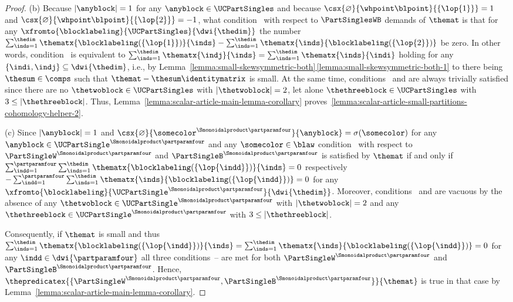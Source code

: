 \documentclass[pdftex]{sigma}
\numberwithin{equation}{section}
\begin{document}
{\begin{proof}
    (b)
 Because $|\anyblock|=1$ for any $\anyblock\in\UCPartSingles$ and because $\csx{\varnothing}{\whpoint\blpoint}{\{\lop{1}\}}=1$ and $\csx{\varnothing}{\whpoint\blpoint}{\{\lop{2}\}}=-1$,  what con\-di\-tion~\conditionone{} with respect to $\PartSinglesWB$ demands of $\themat$ is that for any $\xfromto{\blocklabeling}{\UCPartSingles}{\dwi{\thedim}}$ the number $\sum_{\inds=1}^\thedim\thematx{\blocklabeling(\{\lop{1}\})}{\inds}-\sum_{\inds=1}^\thedim\thematx{\inds}{\blocklabeling(\{\lop{2}\})}$ be zero. In other words, condition~\conditionone{} is equivalent to $\sum_{\inds=1}^\thedim\thematx{\indj}{\inds}=\sum_{\inds=1}^\thedim\thematx{\inds}{\indi}$ holding for any $\{\indi,\indj\}\subseteq \dwi{\thedim}$, i.e., by Lem\-ma~\hyperref[lemma:small-skewsymmetric-both-1]{\ref*{lemma:small-skewsymmetric-both}\,\ref*{lemma:small-skewsymmetric-both-1}} to there being $\thesum\in\comps$ such that $\themat-\thesum\identitymatrix$ is small.
    At the same time, con\-di\-tions~\conditiontwo{} and \conditionthree{} are always trivially satisfied since there are no $\thetwoblock\in \UCPartSingles$ with $|\thetwoblock|=2$, let alone $\thethreeblock\in\UCPartSingles$ with $3\leq|\thethreeblock|$. Thus,  Lem\-ma~\ref{lemma:scalar-article-main-lemma-corollary} proves~\ref{lemma:scalar-article-small-partitions-cohomology-helper-2}.

  (c)
 Since $|\anyblock|=1$ and $\csx{\varnothing}{\somecolor^{\Smonoidalproduct\partparamfour}}{\anyblock}=\sigma(\somecolor)$ for any $\anyblock\in \UCPartSingle^{\Smonoidalproduct\partparamfour}$ and any $\somecolor\in\blaw$ con\-di\-tion~\conditionone{}  with respect to $\PartSingleW^{\Smonoidalproduct\partparamfour}$ and $\PartSingleB^{\Smonoidalproduct\partparamfour}$ is satisfied by $\themat$ if and only if $\sum_{\indd=1}^\partparamfour\sum_{\inds=1}^\thedim \thematx{\blocklabeling(\{\lop{\indd}\})}{\inds}=0$ respectively $-\sum_{\indd=1}^\partparamfour\sum_{\inds=1}^\thedim \thematx{\inds}{\blocklabeling(\{\lop{\indd}\})}=0$
for any $\xfromto{\blocklabeling}{\UCPartSingle^{\Smonoidalproduct\partparamfour}}{\dwi{\thedim}}$. Moreover, con\-di\-tions~\conditiontwo{} and \conditionthree{}  are vacuous by the absence of any $\thetwoblock\in\UCPartSingle^{\Smonoidalproduct\partparamfour}$ with $|\thetwoblock|=2$ and any $\thethreeblock\in\UCPartSingle^{\Smonoidalproduct\partparamfour}$ with $3\leq |\thethreeblock|$.

Consequently, if $\themat$ is small and thus $\sum_{\inds=1}^\thedim\thematx{\blocklabeling(\{\lop{\indd}\})}{\inds}=\sum_{\inds=1}^\thedim\thematx{\inds}{\blocklabeling(\{\lop{\indd}\})}=0$ for any $\indd\in \dwi{\partparamfour}$ all three conditions~\conditionone{}--\conditionthree{} are met for both $\PartSingleW^{\Smonoidalproduct\partparamfour}$ and $\PartSingleB^{\Smonoidalproduct\partparamfour}$. Hence, $\thepredicatex{\{\PartSingleW^{\Smonoidalproduct\partparamfour},\PartSingleB^{\Smonoidalproduct\partparamfour}\}}{\themat}$ is true in that case by Lem\-ma~\ref{lemma:scalar-article-main-lemma-corollary}.


\end{proof}}
\end{document}
